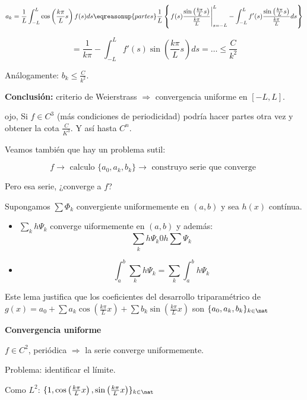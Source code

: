 		\[a_k = \frac{1}{L} \int^L_{-L} \cos \left( \frac{k \pi}{L} s \right) f(s) ds \eqreasonup{partes} \frac{1}{L} \left\{ \left. f(s) \frac{\sin \left( \frac{k \pi}{L} s \right)}{\frac{k \pi}{L}} \right|_{s=-L}^{L} -  \int^L_{-L} f'(s) \frac{\sin \left( \frac{k \pi}{L} s \right)}{\frac{k \pi}{L}} ds   \right\}  \]

		\[ = \frac{1}{k\pi} -  \int^L_{-L} f'(s) \sin \left( \frac{k \pi}{L} s \right) ds = … \leq \frac{C}{k^2} \]

		Análogamente: $b_k \leq \frac{C}{k^2}$.

		\textbf{Conclusión:} criterio de Weierstrass $\Rightarrow$ convergencia uniforme en $[-L,L]$.

		\obs ojo, Si $f \in C^3$ (más condiciones de periodicidad) podría hacer partes otra vez y obtener la cota $\frac{C}{K^3}$. Y así hasta $C^n$.

		Veamos también que hay un problema sutil:

		\[f \rightarrow \text{ calculo } \{a_0,a_k,b_k\} \rightarrow \text{ construyo serie que converge } \]

		Pero esa serie, ¿converge a $f$?

		\begin{lemma}
			Supongamos $\sum \Phi_k$ convergiente uniformemente en $(a,b)$ y sea $h(x)$ contínua.

			\begin{itemize}
				\item $\sum_k h \Psi_k$ converge uiformemente en $(a,b)$ y además:
				\[ \sum_k h \Psi_k 0 h \sum \Psi_k\]

				\item \[\int_a^b \sum_k h \Psi_k = \sum_k \int_a^b h \Psi_k \]
			\end{itemize}

		\end{lemma}

		Este lema justifica que los coeficientes del desarrollo triparamétrico de $g(x) = a_0 + \sum a_k \cos \left( \frac{k \pi}{L} x \right) + \sum b_k \sin \left( \frac{k \pi}{L} x \right) $ son $\{a_0,a_k,b_k\}_{k \in \nat}$

		\textbf{Convergencia uniforme}

		$f \in C^2$, periódica $\Rightarrow$ la serie converge uniformemente.

		Problema: identificar el límite.

		Como $L^2$: $\{1, \cos \left( \frac{k \pi}{L} x \right), \sin \left( \frac{k \pi}{L} x \right)\}_{k \in \nat}$

